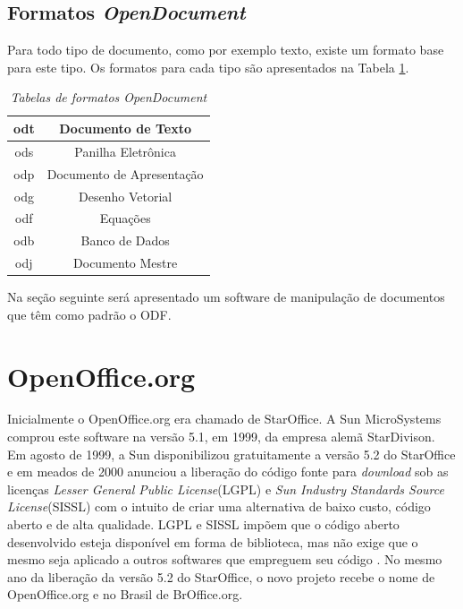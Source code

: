 \subsection{Formatos \textit{OpenDocument}}
Para todo tipo de documento, como por exemplo texto, existe um formato base para este tipo. Os formatos para cada tipo são apresentados na Tabela \ref{tab:tabela1}.
\begin{table}[htb] 
   \centering 
   \large
   \setlength{\arrayrulewidth}{2\arrayrulewidth}  %
   \setlength{\belowcaptionskip}{10pt}  %
   \caption{\it Tabelas de formatos \textit{OpenDocument}}
   \begin{tabular}{|c|c|} %
      \hline
      odt & Documento de Texto \\
      \hline 
      ods & Panilha Eletrônica \\
      \hline
      odp & Documento de Apresentação \\
      \hline
      odg & Desenho Vetorial \\
      \hline
      odf & Equações \\
      \hline
      odb & Banco de Dados \\
      \hline
      odj & Documento Mestre \\
      \hline
   \end{tabular}
   \label{tab:tabela1}
\end{table}

Na seção seguinte será apresentado um software de manipulação de documentos que têm como padrão o ODF.

\section{OpenOffice.org}
Inicialmente o OpenOffice.org era chamado de StarOffice. A Sun MicroSystems comprou este software na versão 5.1, em 1999, da empresa alemã StarDivison. Em agosto de 1999, a Sun disponibilizou gratuitamente a versão 5.2 do StarOffice e em meados de 2000 anunciou a liberação do código fonte para \textit{download} sob as licenças \textit{Lesser General Public License}(LGPL) e \textit{Sun Industry Standards Source License}(SISSL) com o intuito de criar uma alternativa de baixo custo, código aberto e de alta qualidade. LGPL e SISSL impõem que o código aberto desenvolvido esteja disponível em forma de biblioteca, mas não exige que o mesmo seja aplicado a outros softwares que empreguem seu código \cite{wiki:oo.org}. No mesmo ano da liberação da versão 5.2 do StarOffice, o novo projeto recebe o nome de OpenOffice.org e no Brasil de BrOffice.org.

